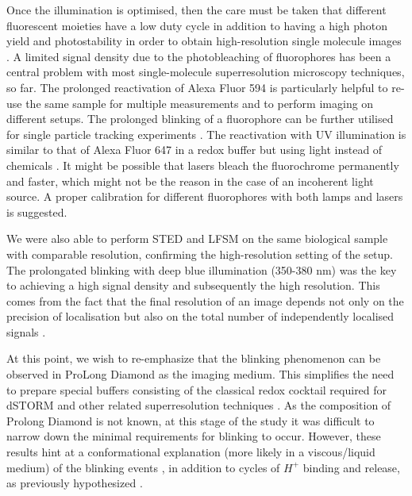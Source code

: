 \documentclass[9pt,twocolumn,twoside]{pnas-new}
\begin{document}
Once the illumination is optimised, then the care must be taken that different fluorescent moieties have a low duty cycle in addition to having a high photon yield and photostability in order to obtain high-resolution single molecule images \citep{dempsey2011evaluation}.  A limited signal density due to the photobleaching of fluorophores has been a central problem with most single-molecule superresolution microscopy techniques, so far. The prolonged reactivation of Alexa Fluor 594 is particularly helpful to re-use the same sample for multiple measurements and to perform imaging on different setups. The prolonged blinking of a fluorophore can be further utilised for single particle tracking experiments \citep{manley2008high, gahlmann2014exploring, balzarotti2017nanometer}. The reactivation with UV illumination is similar to that of Alexa Fluor 647 in a redox buffer but using light instead of chemicals \citep{heilemann2008subdiffraction, vogelsang2010make}.  It might be possible that lasers bleach the fluorochrome permanently and faster, which might not be the reason in the case of an incoherent light source. A proper calibration for different fluorophores with both lamps and lasers is suggested. 

We were also able to perform STED and LFSM on the same biological sample with comparable resolution, confirming the high-resolution setting of the setup. The prolongated blinking with deep blue illumination (350-380 nm) was the key to achieving a high signal density and subsequently the high resolution. This comes from the fact that the final resolution of an image depends not only on the precision of localisation but also on the total number of independently localised signals \citep{legant2016high, prakash2017investigating}.

At this point, we wish to re-emphasize that the blinking phenomenon can be observed in ProLong Diamond as the imaging medium. This simplifies the need to prepare special buffers consisting of the classical redox cocktail required for dSTORM \citep{heilemann2008subdiffraction} and other related superresolution techniques \citep{szczurek2014single}. As the composition of Prolong Diamond is not known, at this stage of the study it was difficult to narrow down the minimal requirements for blinking to occur. However, these results hint at a conformational explanation (more likely in a viscous/liquid medium) of the blinking events \citep{baddeley2009light, estevez2009sequence}, in addition to cycles of $H^+$ binding and release, as previously hypothesized  \citep{folling2008fluorescence, zurek2015localization}.  
\end{document}
